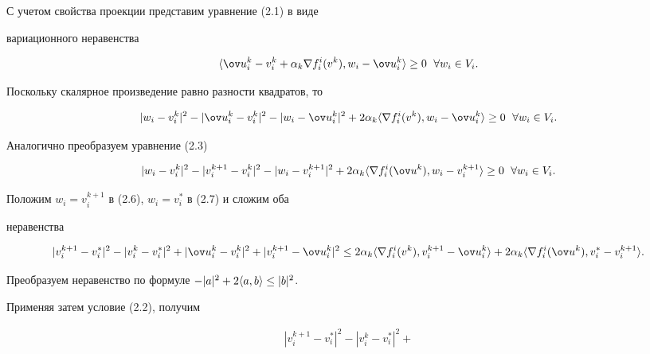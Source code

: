 \begin{pf} 


С учетом свойства проекции представим уравнение (2.1) в виде 


вариационного неравенства 


$$ 


\la\ov u{}^k_i-v^k_i+\alpha_k\nabla f^i_i(v^k), 


w_i-\ov u{}^k_i\ra\ge0\ \; \forall w_i\in V_i.


$$ 


Поскольку скалярное произведение равно разности квадратов, то 


\begin{equation} 


|w_i-v^k_i|^2-|\ov u{}^k_i-v^k_i|^2- 


|w_i-\ov u{}^k_i|^2+2\alpha_k\la\nabla f^i_i(v^k), 


w_i-\ov u{}^k_i\ra\ge0\ \; \forall w_i\in V_i. 


\end{equation} 


Аналогично преобразуем уравнение (2.3) 


\begin{equation} 


|w_i-v^k_i|^2-|v^{k+1}_i-v^k_i|^2- 


|w_i-v^{k+1}_i|^2+2\alpha_k\la\nabla 


f^i_i(\ov u{}^k),w_i-v^{k+1}_i\ra\ge0\ \; \forall w_i\in V_i. 


\end{equation} 


Положим $w_i=v^{k+1}_i$ в (2.6), $w_i=v^*_i$ в (2.7) и сложим оба 


неравенства 


$$ 


|v^{k+1}_i-v^*_i|^2-|v^k_i-v^*_i|^2+ 


|\ov u{}^k_i-v^k_i|^2+|v^{k+1}_i-\ov u{}^k_i|^2\le 


2\alpha_k\la\nabla f^i_i(v^k),v^{k+1}_i-\ov u{}^k_i\ra+ 


2\alpha_k\la\nabla f^i_i(\ov u{}^k),v^*_i-v^{k+1}_i\ra. 


$$ 


Преобразуем неравенство по формуле $-|a|^2+2\langle a,b\rangle\le|b|^2$. 


Применяя затем условие (2.2), получим 


\begin{multline*} 


|v^{k+1}_i-v^*_i|^2-|v^k_i-v^*_i|^2+ 



\end{multline*}
\end{pf}
